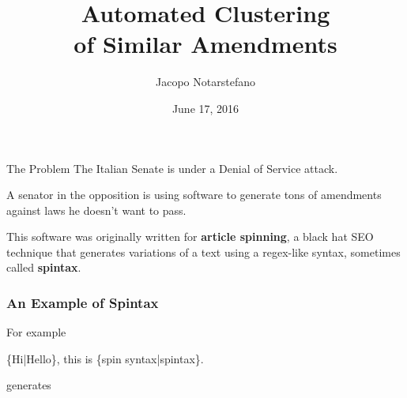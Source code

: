 \documentclass[12pt]{beamer}
\title{
  Automated Clustering\\
  of Similar Amendments
}
\author{Jacopo Notarstefano}
\date{June 17, 2016}
\begin{document}
  \begin{frame}[plain]
    \titlepage{}
  \end{frame}

  \begin{frame}{The Problem}
    The Italian Senate is under a Denial of Service attack.

    \vspace{0.5cm}

    A senator in the opposition is using software to generate tons of amendments
    against laws he doesn't want to pass.

    \vspace{0.5cm}

    This software was originally written for \textbf{article spinning}, a black
    hat SEO technique that generates variations of a text using a regex-like
    syntax, sometimes called \textbf{spintax}.
  \end{frame}

  \begin{frame}[fragile]
    \frametitle{An Example of Spintax}

    For example

    \begin{semiverbatim}
\{Hi|Hello\}, this is \{spin syntax|spintax\}.
\end{semiverbatim}

    generates

    \begin{figure}
      \centering
    \end{figure}
\end{frame}
\end{document}
